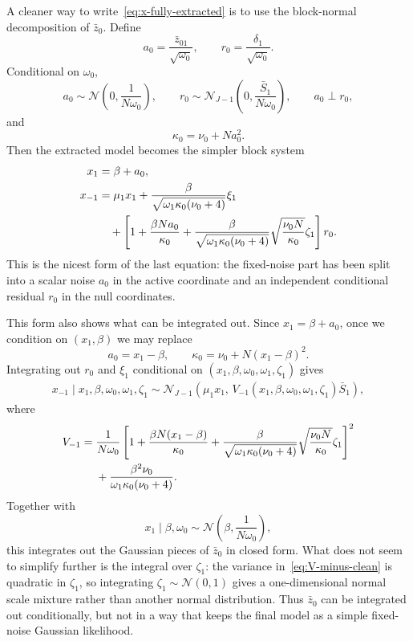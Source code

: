 \documentclass[11pt]{article}
\newcommand{\Normal}{\mathcal N}
\begin{document}
A cleaner way to write~\eqref{eq:x-fully-extracted} is to use the block-normal
decomposition of $\bar z_0$. Define
\[
a_0=\frac{\bar z_{01}}{\sqrt{\omega_0}},
\qquad
r_0=\frac{\delta_1}{\sqrt{\omega_0}}.
\]
Conditional on $\omega_0$,
\[
a_0\sim \Normal\left(0,\frac{1}{N\omega_0}\right),
\qquad
r_0\sim \Normal_{J-1}\left(0,\frac{\bar S_1}{N\omega_0}\right),
\qquad
a_0\perp r_0,
\]
and
\[
\kappa_0=\nu_0+Na_0^2.
\]
Then the extracted model becomes the simpler block system
\begin{align}
x_1
&=
\beta+a_0,
\label{eq:x1-a0}\\
x_{-1}
&=
\mu_1x_1
+\frac{\beta}{\sqrt{\omega_1\kappa_0(\nu_0+4)}}\xi_1
\notag\\
&\quad+
\left[
1+\frac{\beta Na_0}{\kappa_0}
+\frac{\beta}{\sqrt{\omega_1\kappa_0(\nu_0+4)}}
\sqrt{\frac{\nu_0 N}{\kappa_0}}\zeta_1
\right]r_0.
\label{eq:x-minus-clean-block}
\end{align}
This is the nicest form of the last equation: the fixed-noise part has been
split into a scalar noise $a_0$ in the active coordinate and an independent
conditional residual $r_0$ in the null coordinates.

This form also shows what can be integrated out. Since $x_1=\beta+a_0$, once
we condition on $(x_1,\beta)$ we may replace
\[
a_0=x_1-\beta,
\qquad
\kappa_0=\nu_0+N(x_1-\beta)^2.
\]
Integrating out $r_0$ and $\xi_1$ conditional on
$(x_1,\beta,\omega_0,\omega_1,\zeta_1)$ gives
\begin{align}
x_{-1}\mid x_1,\beta,\omega_0,\omega_1,\zeta_1
\sim
\Normal_{J-1}\left(
\mu_1x_1,\,
V_{-1}(x_1,\beta,\omega_0,\omega_1,\zeta_1)\bar S_1
\right),
\label{eq:x-minus-after-r0-xi-integrated}
\end{align}
where
\begin{align}
V_{-1}
=\;&
\frac{1}{N\omega_0}
\left[
1+\frac{\beta N(x_1-\beta)}{\kappa_0}
+\frac{\beta}{\sqrt{\omega_1\kappa_0(\nu_0+4)}}
\sqrt{\frac{\nu_0 N}{\kappa_0}}\zeta_1
\right]^2
\notag\\
&+
\frac{\beta^2\nu_0}{\omega_1\kappa_0(\nu_0+4)}.
\label{eq:V-minus-clean}
\end{align}
Together with
\[
x_1\mid \beta,\omega_0
\sim
\Normal\left(\beta,\frac{1}{N\omega_0}\right),
\]
this integrates out the Gaussian pieces of $\bar z_0$ in closed form. What
does not seem to simplify further is the integral over $\zeta_1$: the variance
in~\eqref{eq:V-minus-clean} is quadratic in $\zeta_1$, so integrating
$\zeta_1\sim\Normal(0,1)$ gives a one-dimensional normal scale mixture rather
than another normal distribution. Thus $\bar z_0$ can be integrated out
conditionally, but not in a way that keeps the final model as a simple
fixed-noise Gaussian likelihood.
\end{document}
